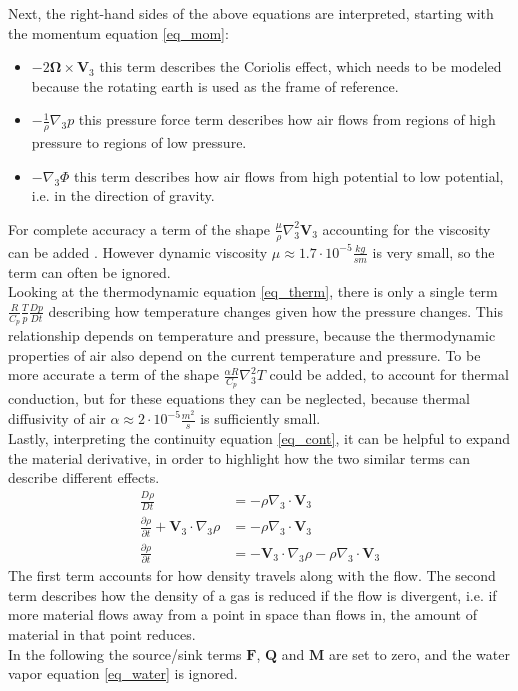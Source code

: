 Next, the right-hand sides of the above equations are interpreted, starting with the momentum equation \ref{eq_mom}:
\begin{itemize}
\item $-2\boldsymbol{\Omega}\times \textbf{V}_3$ this term describes the Coriolis effect, which needs to be modeled because the rotating earth is used as the frame of reference.
\item $- \frac{1}{\rho}\nabla _3 p$ this pressure force term describes how air flows from regions of high pressure to regions of low pressure.
\item $- \nabla _3 \Phi$ this term describes how air flows from high  potential to low potential, i.e. in the direction of gravity.
\end{itemize}
For complete accuracy a term of the shape $\frac{\mu}{\rho} \nabla _3^2 \textbf{V}_3$ accounting for the viscosity can be added \cite{cabralnsthermo}.
However dynamic viscosity $\mu \approx 1.7\cdot 10^{-5}\frac{kg}{sm}$\cite{pennlectureconsts} is very small, so the term can often be ignored.
\\
Looking at the thermodynamic equation \ref{eq_therm}, there is only a single term $\frac{R}{C_p}\frac{T}{p}\frac{Dp}{Dt}$ describing how temperature changes given how the pressure changes.
This relationship depends on temperature and pressure, because the thermodynamic properties of air also depend on the current temperature and pressure.
To be more accurate a term of the shape $\frac{\alpha R}{C_p}\nabla _3^2 T$ could be added, to account for thermal conduction, but for these equations they can be neglected, because thermal diffusivity of air $\alpha \approx 2\cdot 10^{-5}\frac{m^2}{s}$ \cite{pennlectureconsts} is sufficiently small.
\\
Lastly, interpreting the continuity equation \ref{eq_cont}, it can be helpful to expand the material derivative, in order to highlight how the two similar terms can describe different effects.
\begin{align*}
\frac{D\rho}{Dt} &= -\rho \nabla _3 \cdot \textbf{V}_3\\
\frac{\partial \rho}{\partial t} + \textbf{V}_3 \cdot \nabla _3 \rho &= -\rho \nabla _3 \cdot \textbf{V}_3\\
\frac{\partial \rho}{\partial t} &=  - \textbf{V}_3 \cdot \nabla _3 \rho -\rho \nabla _3 \cdot \textbf{V}_3
\end{align*}
The first term accounts for how density travels along with the flow.
The second term describes how the density of a gas is reduced if the flow is divergent, i.e. if more material flows away from a point in space than flows in, the amount of material in that point reduces.
\\
In the following the source/sink terms $\textbf{F}$, $\textbf{Q}$ and $\textbf{M}$ are set to zero, and the water vapor equation \ref{eq_water} is ignored.

